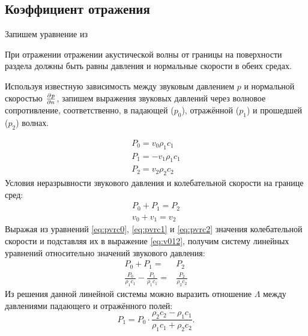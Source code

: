 \documentclass[a4paper, fontsize=14pt]{article}
\begin{document}
	\subsection{Коэффициент отражения}
	Запишем уравнение из 	
	
	
	При отражении отражении акустической волны от границы на поверхности раздела должны быть равны давления и нормальные скорости в обеих средах.

	
	Используя известную  зависимость между звуковым давлением $p$ и нормальной скоростью $\frac{\partial ^ {  } p}{\partial n ^ {  } }$, запишем выражения звуковых давлений через волновое сопротивление, соответственно, в падающей ($p_0$), отражённой ($p_1$) и прошедшей ($p_2$) волнах. \cite{brehovskih} 
	
	
	\begin{eqnarray}
		P_0 = v_0 \rho_1 c_1 \label{eq:pvrc0} \\
		P_1 = - v_1 \rho_1 c_1 \label{eq:pvrc1}\\
		P_2 = v_2 \rho_2 c_2 \label{eq:pvrc2}
	\end{eqnarray}
	Условия неразрывности звукового давления и колебательной скорости на границе сред:
	\begin{eqnarray}
		P_0 + P_1 = P_2 \label{eq:p012}\\
		v_0 + v_1 = v_2 \label{eq:v012}
	\end{eqnarray}
	Выражая из уравнений \ref{eq:pvrc0}, \ref{eq:pvrc1} и \ref{eq:pvrc2} значения колебательной скорости и подставляя их в выражение \ref{eq:v012}, получим систему линейных уравнений относительно значений звукового давления:
	\begin{eqnarray}
		P_0 + P_1 =& P_2 \nonumber\\
		\frac{P_0}{\rho_1 c_1} - \frac{P_1}{\rho_1 c_1} =& \frac{P_2}{\rho_2 c_2} 
	\end{eqnarray}
	Из решения данной линейной системы можно выразить отношение $\Lambda$ между давлениями падающего и отражённого полей:
	\begin{equation}
		P_1 = P_0 \cdot \frac{\rho_2 c_2 - \rho_1 c_1}{\rho_1 c_1 + \rho_2 c_2 }.
		\label{eq:nreflratio}
	\end{equation}
	
\end{document}
